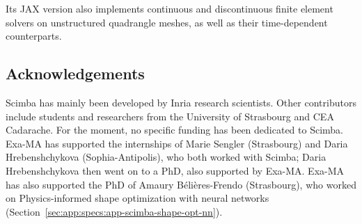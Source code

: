 Its JAX version also implements continuous and discontinuous finite element solvers on unstructured quadrangle meshes, as well as their time-dependent counterparts.




\subsection{Acknowledgements}
\label{sec::Scimba:acknowledgements}

Scimba has mainly been developed by Inria research scientists.
Other contributors include students and researchers
from the University of Strasbourg and CEA Cadarache.
For the moment, no specific funding has been dedicated to Scimba.
Exa-MA has supported the internships of Marie Sengler (Strasbourg) and Daria Hrebenshchykova (Sophia-Antipolis), who both worked with Scimba; Daria Hrebenshchykova then went on to a PhD, also supported by Exa-MA.
Exa-MA has also supported the PhD of Amaury Bélières-Frendo (Strasbourg), who worked on Physics-informed shape optimization with neural networks (Section~\ref{sec:app:specs:app-scimba-shape-opt-nn}).
